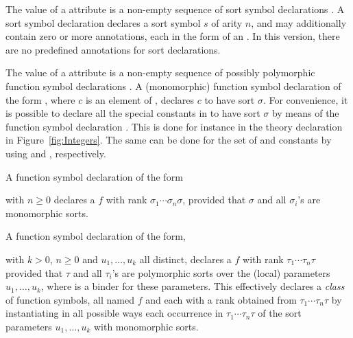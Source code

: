 The value of a  attribute is a non-empty sequence
of sort symbol declarations .
A sort symbol declaration  declares 
a sort symbol $s$ of arity $n$, and 
may additionally contain zero or more annotations,
each in the form of an .
In this version, there are no predefined annotations for sort declarations.

The value of a  attribute is a non-empty sequence
of possibly polymorphic function symbol declarations .
A (monomorphic)
function symbol declaration 
of the form ,
where $c$ is an element of ,
declares $c$ to have sort $\sigma$.
For convenience,
it is possible to declare all the special constants in  
to have sort $\sigma$ by means of the function symbol declaration
.
This is done for instance in the theory declaration in Figure~\ref{fig:Integers}.
The same can be done for the set of  and  constants
by using  and , respectively. 
 
A function symbol declaration of the form
\begin{center}
\end{center}
with $n \geq 0$ declares a  $f$ with rank 
$\sigma_1\cdots\sigma_n\sigma$,
provided that $\sigma$ and all $\sigma_i$'s are monomorphic sorts.

A function symbol declaration of the form,
\begin{center}
\end{center}
with $k > 0$, $n \geq 0$ and $u_1, \ldots, u_k$ all distinct,
declares a  $f$ with rank $\tau_1\cdots\tau_n\tau$
provided that $\tau$ and all $\tau_i$'s are polymorphic sorts over 
the (local) parameters $u_1, \ldots, u_k$, where  is a binder for
these parameters.
This effectively declares a \emph{class} of function symbols, 
all named $f$ and each with a rank obtained from $\tau_1\cdots\tau_n\tau$ 
by instantiating in all possible ways each occurrence in $\tau_1\cdots\tau_n\tau$
of the sort parameters $u_1,\ldots,u_k$ with monomorphic sorts.

